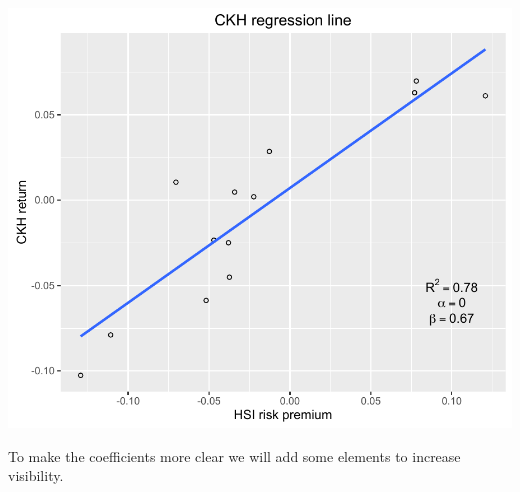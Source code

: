 \documentclass[]{article}
\begin{document}
\begin{center}\includegraphics{11_Linear_Regression_Plot_pdf/lr_11-1} \end{center}

To make the coefficients more clear we will add some elements to
increase visibility.
\end{document}
